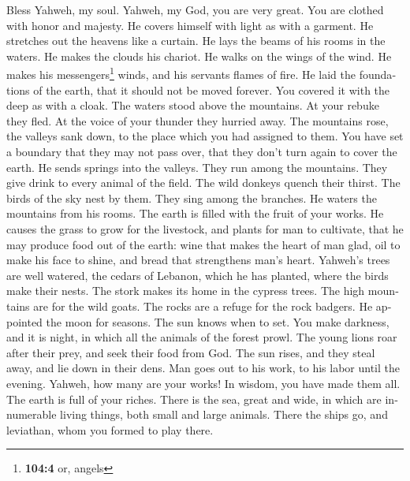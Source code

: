 \begin{paracol}{2}
\begin{otherlanguage}{english}
 Bless Yahweh, my soul. Yahweh, my God, you are very
great. You are clothed with honor and majesty.  He covers
himself with light as with a garment. He stretches out the heavens like
a curtain.  He lays the beams of his rooms in the waters.
He makes the clouds his chariot. He walks on the wings of the wind.
 He makes his messengers\footnote{\textbf{104:4} or,
  angels} winds, and his servants flames of fire.  He laid
the foundations of the earth, that it should not be moved forever.
 You covered it with the deep as with a cloak. The waters
stood above the mountains.  At your rebuke they fled. At
the voice of your thunder they hurried away.  The
mountains rose, the valleys sank down, to the place which you had
assigned to them.  You have set a boundary that they may
not pass over, that they don't turn again to cover the earth.
 He sends springs into the valleys. They run among the
mountains.  They give drink to every animal of the field.
The wild donkeys quench their thirst.  The birds of the
sky nest by them. They sing among the branches.  He
waters the mountains from his rooms. The earth is filled with the fruit
of your works.  He causes the grass to grow for the
livestock, and plants for man to cultivate, that he may produce food out
of the earth:  wine that makes the heart of man glad, oil
to make his face to shine, and bread that strengthens man's heart.
 Yahweh's trees are well watered, the cedars of Lebanon,
which he has planted,  where the birds make their nests.
The stork makes its home in the cypress trees.  The high
mountains are for the wild goats. The rocks are a refuge for the rock
badgers.  He appointed the moon for seasons. The sun
knows when to set.  You make darkness, and it is night,
in which all the animals of the forest prowl.  The young
lions roar after their prey, and seek their food from God.
 The sun rises, and they steal away, and lie down in
their dens.  Man goes out to his work, to his labor until
the evening.  Yahweh, how many are your works! In wisdom,
you have made them all. The earth is full of your riches.
 There is the sea, great and wide, in which are
innumerable living things, both small and large animals. 
There the ships go, and leviathan, whom you formed to play there.

\end{otherlanguage}
\end{paracol}
